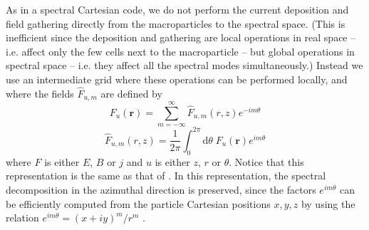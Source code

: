 \documentclass[1p,times]{elsarticle}
\newcommand{\TInteg}[1]{\int_{0}^{2\pi} \!\!\!\!\!\! \mathrm{d}#1}
\renewcommand{\vec}[1]{\boldsymbol{#1}}
\begin{document}
As in a spectral Cartesian code, we do not perform the
current deposition and field gathering directly from the
macroparticles to the spectral space. (This is inefficient since the
deposition and gathering are local operations in real space -- i.e. affect
only the few cells next to the macroparticle -- but global operations
in spectral space -- i.e. they affect all the spectral modes
simultaneously.) Instead we use an intermediate grid where these
operations can be performed locally, and where the fields $\hat{F}_{u,m}$
are defined by
\begin{equation} 
\label{eq:IntermBwTrans}
F_u(\vec{r}) = \sum_{m=-\infty}^{\infty} \hat{F}_{u,m}(r,z)
e^{-im\theta} 
\end{equation}
\begin{equation}
\label{eq:IntermFwTrans}
\hat{F}_{u,m}(r,z) = \frac{1}{2\pi} \TInteg{\theta} \;
F_u(\vec{r})e^{im\theta}
\end{equation}
where ${F}$ is either ${E}$, ${B}$ or
${j}$ and $u$ is either $z$, $r$ or $\theta$. Notice that this representation is the
same as that of \citep{Lifschitz, Davidson}. In this
representation, the spectral decomposition in the azimuthal
direction is preserved, since the factors $e^{im\theta}$ can be efficiently computed from the
particle Cartesian positions $x,y,z$ by using the relation $e^{im\theta} = (x+iy)^m/r^m$
\citep{Lifschitz}.
\end{document}
